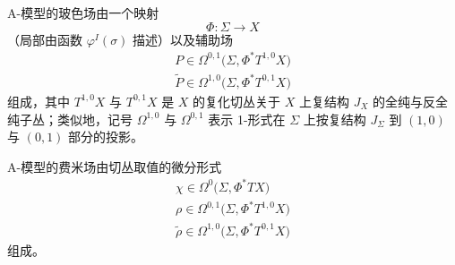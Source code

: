 A-模型的玻色场由一个映射
\[
\Phi:\Sigma\to X
\]
（局部由函数 $\varphi^I(\sigma)$ 描述）以及辅助场
\begin{gather*}
P\in\Omega^{0,1}\big(\Sigma,\Phi^*T^{1,0}X\big)\\
\tilde P\in\Omega^{1,0}\big(\Sigma,\Phi^*T^{0,1}X\big)
\end{gather*}
组成，其中 $T^{1,0}X$ 与 $T^{0,1}X$ 是 $X$ 的复化切丛关于 $X$ 上复结构 $J_X$ 的全纯与反全纯子丛；类似地，记号 $\Omega^{1,0}$ 与 $\Omega^{0,1}$ 表示 1-形式在 $\Sigma$ 上按复结构 $J_\Sigma$ 到 $(1,0)$ 与 $(0,1)$ 部分的投影。

A-模型的费米场由切丛取值的微分形式
\begin{gather*}
\chi\in\Omega^0\big(\Sigma,\Phi^*TX\big)\\
\rho\in\Omega^{0,1}\big(\Sigma,\Phi^*T^{1,0}X\big)\\
\tilde\rho\in\Omega^{1,0}\big(\Sigma,\Phi^*T^{0,1}X\big)
\end{gather*}
组成。


